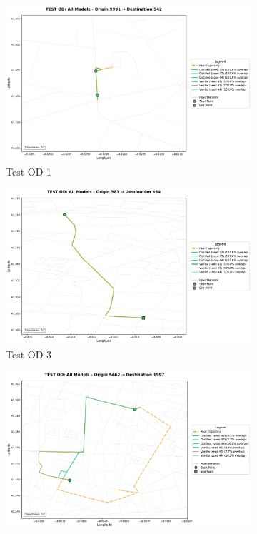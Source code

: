 \begin{figure}[H]
    \centering
    \begin{subfigure}{0.49\linewidth}
        \centering
        \includegraphics[width=\linewidth]{assets/plots/eval/porto/trajectories/test_od_comparison_1_origin9991_dest542.pdf}
        \caption{Test OD 1}
    \end{subfigure}
    \begin{subfigure}{0.49\linewidth}
        \centering
        \includegraphics[width=\linewidth]{assets/plots/eval/porto/trajectories/test_od_comparison_3_origin587_dest554.pdf}
        \caption{Test OD 3}
    \end{subfigure}
    \begin{subfigure}{0.49\linewidth}
        \centering
        \includegraphics[width=\linewidth]{assets/plots/eval/porto/trajectories/test_od_comparison_5_origin5462_dest1997.pdf}

\end{subfigure}
\end{figure}
